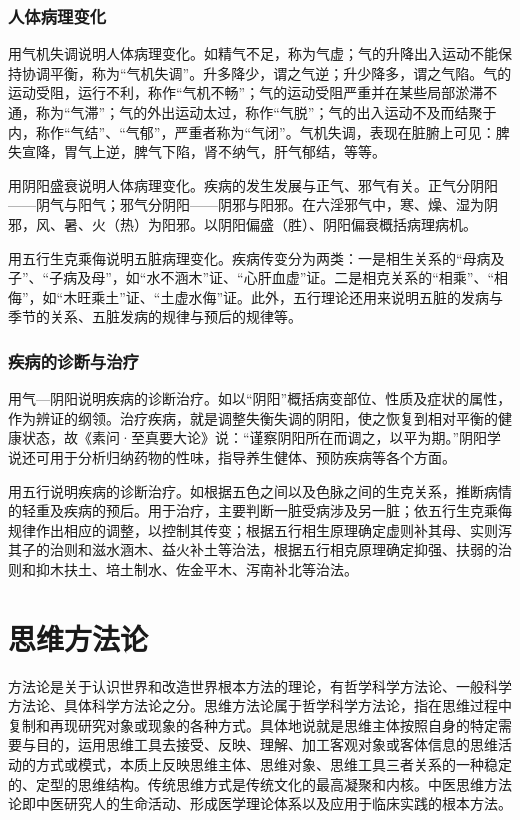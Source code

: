 \documentclass[draft,12pt]{ctexbook}
\begin{document}
\subsubsection{人体病理变化}%

用气机失调说明人体病理变化。如精气不足，称为气虚；气的升降出入运动不能保持协调平衡，称为“气机失调”。升多降少，谓之气逆；升少降多，谓之气陷。气的运动受阻，运行不利，称作“气机不畅”；气的运动受阻严重并在某些局部淤滞不通，称为“气滞”；气的外出运动太过，称作“气脱”；气的出入运动不及而结聚于内，称作“气结”、“气郁”，严重者称为“气闭”。气机失调，表现在脏腑上可见：脾失宣降，胃气上逆，脾气下陷，肾不纳气，肝气郁结，等等。

用阴阳盛衰说明人体病理变化。疾病的发生发展与正气、邪气有关。正气分阴阳——阴气与阳气；邪气分阴阳——阴邪与阳邪。在六淫邪气中，寒、燥、湿为阴邪，风、暑、火（热）为阳邪。以阴阳偏盛（胜）、阴阳偏衰概括病理病机。

用五行生克乘侮说明五脏病理变化。疾病传变分为两类：一是相生关系的“母病及子”、“子病及母”，如“水不涵木”证、“心肝血虚”证。二是相克关系的“相乘”、“相侮”，如“木旺乘土”证、“土虚水侮”证。此外，五行理论还用来说明五脏的发病与季节的关系、五脏发病的规律与预后的规律等。

\subsubsection{疾病的诊断与治疗}%

用气—阴阳说明疾病的诊断治疗。如以“阴阳”概括病变部位、性质及症状的属性，作为辨证的纲领。治疗疾病，就是调整失衡失调的阴阳，使之恢复到相对平衡的健康状态，故《素问·至真要大论》说：“谨察阴阳所在而调之，以平为期。”阴阳学说还可用于分析归纳药物的性味，指导养生健体、预防疾病等各个方面。

用五行说明疾病的诊断治疗。如根据五色之间以及色脉之间的生克关系，推断病情的轻重及疾病的预后。用于治疗，主要判断一脏受病涉及另一脏；依五行生克乘侮规律作出相应的调整，以控制其传变；根据五行相生原理确定虚则补其母、实则泻其子的治则和滋水涵木、益火补土等治法，根据五行相克原理确定抑强、扶弱的治则和抑木扶土、培土制水、佐金平木、泻南补北等治法。

\section{思维方法论}%

方法论是关于认识世界和改造世界根本方法的理论，有哲学科学方法论、一般科学方法论、具体科学方法论之分。思维方法论属于哲学科学方法论，指在思维过程中复制和再现研究对象或现象的各种方式。具体地说就是思维主体按照自身的特定需要与目的，运用思维工具去接受、反映、理解、加工客观对象或客体信息的思维活动的方式或模式，本质上反映思维主体、思维对象、思维工具三者关系的一种稳定的、定型的思维结构。传统思维方式是传统文化的最高凝聚和内核。中医思维方法论即中医研究人的生命活动、形成医学理论体系以及应用于临床实践的根本方法。
\end{document}
